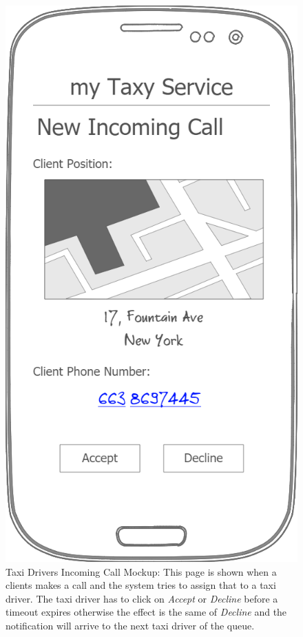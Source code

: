 \documentclass[a4paper]{article}
\begin{document}
\begin{enumerate}[label=\bfseries G\arabic*:]
\begin{figure}[H]
\includegraphics[width=\mockupWidth]{Mockup-TaxiDriversNewIncomingCall}
\centering
\caption[Taxi Drivers Incoming Call Mockup]{Taxi Drivers Incoming Call Mockup: \newline This page is shown when a clients makes a call and the system tries to assign that to a taxi driver. The taxi driver has to click on \emph{Accept} or \emph{Decline} before a timeout expires otherwise the effect is the same of \emph{Decline} and the notification will arrive to the next taxi driver of the queue.}
\label{fig:mockuptaxidriverincomingcall}
\end{figure}


\end{enumerate}
\end{document}
